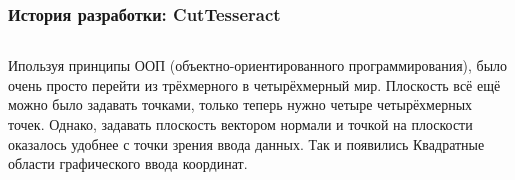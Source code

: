 \documentclass[10pt,pdf,hyperref={unicode}]{beamer}
\begin{document}

\begin{frame}
\frametitle{История разработки: {\bf CutTesseract}}
	\begin{columns}
		Ипользуя принципы ООП (объектно-ориентированного программирования),
		было очень просто перейти из трёхмерного в четырёхмерный мир. 
		Плоскость всё ещё можно было задавать точками, только теперь нужно
		четыре четырёхмерных точек. Однако, задавать плоскость вектором нормали
		и точкой на плоскости оказалось удобнее с точки зрения ввода данных.
		Так и появились Квадратные области графического ввода координат.
	\end{columns}
\end{frame}
\end{document}

